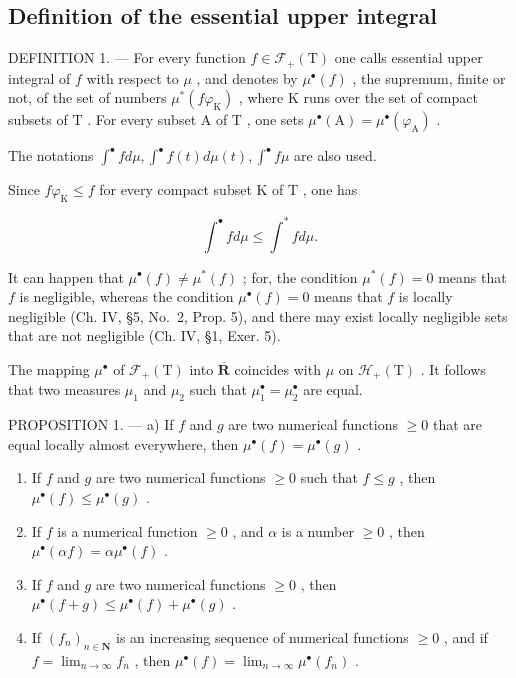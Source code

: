 \subsection{Definition of the essential upper integral}

DEFINITION 1. --- For every function \(f \in \mathcal{F}_{+}(\mathrm{T})\) one calls essential upper integral of \(f\) with respect to \(\mu\) , and denotes by \(\mu^{\bullet}(f)\) , the supremum, finite or not, of the set of numbers \(\mu^{*}(f\varphi_{\mathrm{K}})\) , where \(\mathrm{K}\) runs over the set of compact subsets of \(\mathrm{T}\) . For every subset \(\mathrm{A}\) of \(\mathrm{T}\) , one sets \(\mu^{\bullet}(\mathrm{A}) = \mu^{\bullet}(\varphi_{\mathrm{A}})\) .

The notations \(\int^{\bullet}f d\mu ,\int^{\bullet}f(t)d\mu (t),\int^{\bullet}f\mu\) are also used.

Since \(f\varphi_{\mathrm{K}} \leqslant f\) for every compact subset \(\mathrm{K}\) of \(\mathrm{T}\) , one has

\[
\int^ {\bullet} f d \mu \leqslant \int^ {*} f d \mu .\tag{1}
\]

It can happen that \(\mu^{\bullet}(f) \neq \mu^{*}(f)\) ; for, the condition \(\mu^{*}(f) = 0\) means that \(f\) is negligible, whereas the condition \(\mu^{\bullet}(f) = 0\) means that \(f\) is locally negligible (Ch. IV, §5, No.~2, Prop. 5), and there may exist locally negligible sets that are not negligible (Ch. IV, §1, Exer. 5).

The mapping \(\mu^{\bullet}\) of \(\mathcal{F}_{+}(\mathrm{T})\) into \(\overline{\mathbf{R}}\) coincides with \(\mu\) on \(\mathcal{H}_{+}(\mathrm{T})\) . It follows that two measures \(\mu_{1}\) and \(\mu_{2}\) such that \(\mu_{1}^{\bullet} = \mu_{2}^{\bullet}\) are equal.

PROPOSITION 1. --- a) If \(f\) and \(g\) are two numerical functions \(\geqslant 0\) that are equal locally almost everywhere, then \(\mu^{\bullet}(f) = \mu^{\bullet}(g)\) .

\begin{enumerate}
\def\labelenumi{\alph{enumi})}
\setcounter{enumi}{1}
\item
  If \(f\) and \(g\) are two numerical functions \(\geqslant 0\) such that \(f \leqslant g\) , then \(\mu^{\bullet}(f) \leqslant \mu^{\bullet}(g)\) .
\item
  If \(f\) is a numerical function \(\geqslant 0\) , and \(\alpha\) is a number \(\geqslant 0\) , then \(\mu^{\bullet}(\alpha f) = \alpha \mu^{\bullet}(f)\) .
\item
  If \(f\) and \(g\) are two numerical functions \(\geqslant 0\) , then \(\mu^{\bullet}(f + g) \leqslant \mu^{\bullet}(f) + \mu^{\bullet}(g)\) .
\item
  If \((f_n)_{n\in \mathbf{N}}\) is an increasing sequence of numerical functions \(\geqslant 0\) , and if \(f = \lim_{n\to \infty}f_n\) , then \(\mu^{\bullet}(f) = \lim_{n\to \infty}\mu^{\bullet}(f_n)\) .
\end{enumerate}


